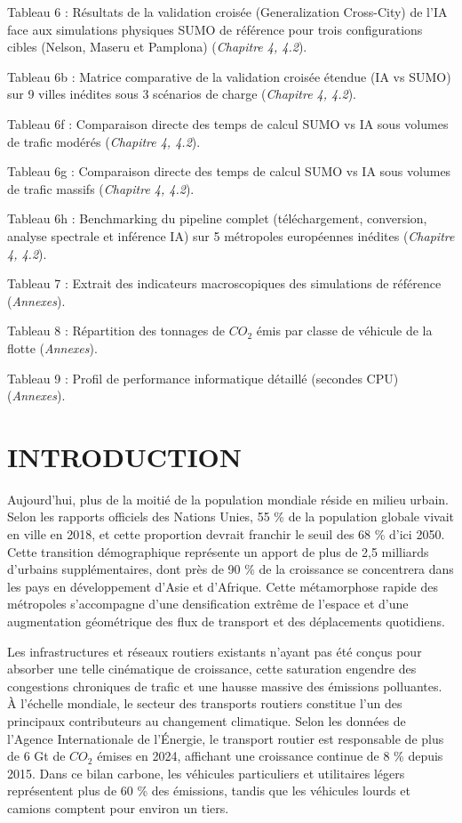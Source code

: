 \documentclass[10pt, a4paper]{article}
\begin{document}
Tableau 6 : Résultats de la validation croisée (Generalization
Cross-City) de l'IA face aux simulations physiques SUMO de référence
pour trois configurations cibles (Nelson, Maseru et Pamplona)
(\emph{Chapitre 4, 4.2}).

Tableau 6b : Matrice comparative de la validation croisée étendue (IA vs
SUMO) sur 9 villes inédites sous 3 scénarios de charge (\emph{Chapitre
4, 4.2}).

Tableau 6f : Comparaison directe des temps de calcul SUMO vs IA sous
volumes de trafic modérés (\emph{Chapitre 4, 4.2}).

Tableau 6g : Comparaison directe des temps de calcul SUMO vs IA sous
volumes de trafic massifs (\emph{Chapitre 4, 4.2}).

Tableau 6h : Benchmarking du pipeline complet (téléchargement,
conversion, analyse spectrale et inférence IA) sur 5 métropoles
européennes inédites (\emph{Chapitre 4, 4.2}).

Tableau 7 : Extrait des indicateurs macroscopiques des simulations de
référence (\emph{Annexes}).

Tableau 8 : Répartition des tonnages de \(CO_2\) émis par classe de
véhicule de la flotte (\emph{Annexes}).

Tableau 9 : Profil de performance informatique détaillé (secondes CPU)
(\emph{Annexes}).

\newpage

\section{INTRODUCTION}\label{introduction}

Aujourd'hui, plus de la moitié de la population mondiale réside en
milieu urbain. Selon les rapports officiels des Nations Unies, 55 \% de
la population globale vivait en ville en 2018, et cette proportion
devrait franchir le seuil des 68 \% d'ici 2050. Cette transition
démographique représente un apport de plus de 2,5 milliards d'urbains
supplémentaires, dont près de 90 \% de la croissance se concentrera dans
les pays en développement d'Asie et d'Afrique. Cette métamorphose rapide
des métropoles s'accompagne d'une densification extrême de l'espace et
d'une augmentation géométrique des flux de transport et des déplacements
quotidiens.

Les infrastructures et réseaux routiers existants n'ayant pas été conçus
pour absorber une telle cinématique de croissance, cette saturation
engendre des congestions chroniques de trafic et une hausse massive des
émissions polluantes. À l'échelle mondiale, le secteur des transports
routiers constitue l'un des principaux contributeurs au changement
climatique. Selon les données de l'Agence Internationale de l'Énergie,
le transport routier est responsable de plus de 6 Gt de \(CO_2\) émises
en 2024, affichant une croissance continue de 8 \% depuis 2015. Dans ce
bilan carbone, les véhicules particuliers et utilitaires légers
représentent plus de 60 \% des émissions, tandis que les véhicules
lourds et camions comptent pour environ un tiers.
\end{document}
